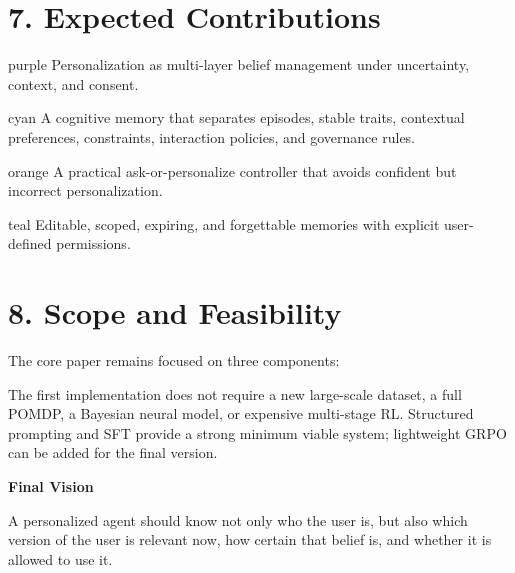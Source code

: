\documentclass[10pt,a4paper]{article}
\begin{document}
\section{7. Expected Contributions}

\begin{keybox}[title=Contribution 1: New Formulation]{purple}
Personalization as multi-layer belief management under uncertainty, context, and consent.
\end{keybox}

\begin{keybox}[title=Contribution 2: New Memory Architecture]{cyan}
A cognitive memory that separates episodes, stable traits, contextual preferences, constraints, interaction policies, and governance rules.
\end{keybox}

\begin{keybox}[title=Contribution 3: Active Decision Policy]{orange}
A practical ask-or-personalize controller that avoids confident but incorrect personalization.
\end{keybox}

\begin{keybox}[title=Contribution 4: User Control]{teal}
Editable, scoped, expiring, and forgettable memories with explicit user-defined permissions.
\end{keybox}

\section{8. Scope and Feasibility}

The core paper remains focused on three components:

\begin{center}
\hfill
{}\hfill
{}
\end{center}

The first implementation does not require a new large-scale dataset, a full POMDP, a Bayesian neural model, or expensive multi-stage RL. Structured prompting and SFT provide a strong minimum viable system; lightweight GRPO can be added for the final version.

\begin{tcolorbox}[enhanced, colback=navy, colframe=navy, arc=2.5mm, boxrule=0pt,
left=4mm,right=4mm,top=3.5mm,bottom=3.5mm]
\centering
{\large\bfseries\color{white} Final Vision}

\vspace{1mm}
{\color{white!90} A personalized agent should know not only who the user is, but also which version of the user is relevant now, how certain that belief is, and whether it is allowed to use it.}
\end{tcolorbox}
\end{document}
